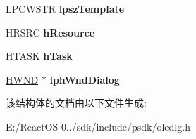 \begin{DoxyCompactItemize}
L\+P\+C\+W\+S\+TR {\bfseries lpsz\+Template}
\item 
\mbox{\label{structtag_o_l_e_u_i_b_u_s_y_w_a95c45c20a8a676cbc9caa75179b4583c}} 
H\+R\+S\+RC {\bfseries h\+Resource}
\item 
\mbox{\label{structtag_o_l_e_u_i_b_u_s_y_w_ae478f715518fc6c6a7b279b6bc43d89e}} 
H\+T\+A\+SK {\bfseries h\+Task}
\item 
\mbox{\label{structtag_o_l_e_u_i_b_u_s_y_w_ab187012bf13afd1d96486fbebdf8a685}} 
\hyperlink{interfacevoid}{H\+W\+ND} $\ast$ {\bfseries lph\+Wnd\+Dialog}
\end{DoxyCompactItemize}


该结构体的文档由以下文件生成\+:\begin{DoxyCompactItemize}
\item 
E\+:/\+React\+O\+S-\/0../sdk/include/psdk/oledlg.\+h\end{DoxyCompactItemize}
